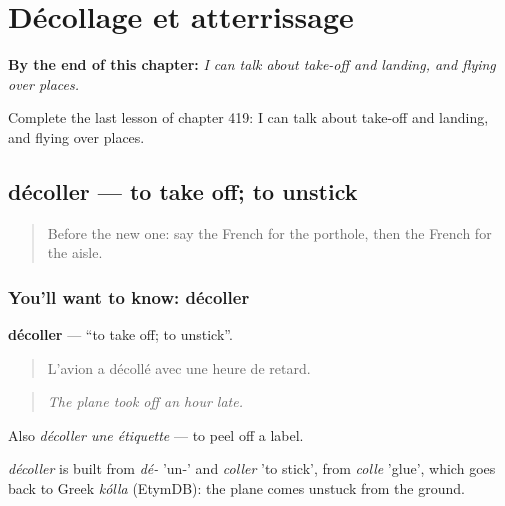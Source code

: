 
\chapter{Décollage et atterrissage}
\label{ch:fr-decollage-et-atterrissage}

\begin{chapteropening}
\textbf{By the end of this chapter:} \emph{I can talk about take-off and landing, and flying over places.}

Complete the last lesson of chapter 419: I can talk about take-off and landing, and flying over places.
\end{chapteropening}

\section[décoller]{décoller — to take off; to unstick}

\label{lesson:FR-C419-decoller}



\begin{quote}
Before the new one: say the French for the porthole, then the French for the aisle.
\end{quote}

\subsection*{You'll want to know: décoller}
\textbf{décoller} — \textquotedblleft{}to take off; to unstick\textquotedblright{}.

\begin{quote}
L'avion a décollé avec une heure de retard.
\end{quote}

\begin{quote}
\emph{The plane took off an hour late.}
\end{quote}

Also \emph{décoller une étiquette} — to peel off a label.

\begin{cousinweb}
\emph{décoller} is built from \emph{dé-} 'un-' and \emph{coller} 'to stick', from \emph{colle} 'glue', which goes back to Greek \emph{kólla} (EtymDB): the plane comes unstuck from the ground.
\end{cousinweb}

